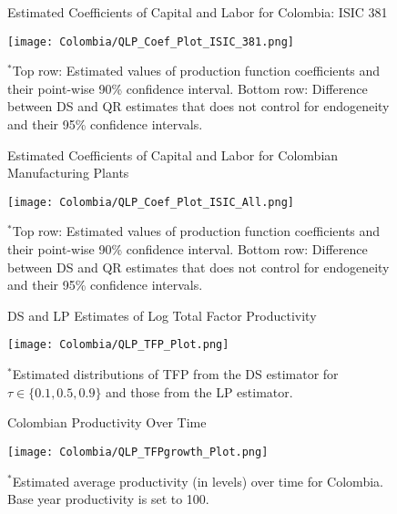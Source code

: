 \documentclass[12pt]{article}
\begin{document}
\begin{appendices}
\begin{figure}[H]
\centering
\caption{Estimated Coefficients of Capital and Labor for Colombia: ISIC 381}
\texttt{[image: Colombia/QLP\_Coef\_Plot\_ISIC\_381.png]}
\caption*{\footnotesize $^{*}$Top row: Estimated values of production function coefficients and their point-wise 90\% confidence interval. Bottom row: Difference between DS and QR estimates that does not control for endogeneity and their 95\% confidence intervals.}
\label{fig:LPCOL381}
\end{figure}

\begin{figure}[H]
\centering
\caption{Estimated Coefficients of Capital and Labor for Colombian Manufacturing Plants}
\texttt{[image: Colombia/QLP\_Coef\_Plot\_ISIC\_All.png]}
\caption*{\footnotesize $^{*}$Top row: Estimated values of production function coefficients and their point-wise 90\% confidence interval. Bottom row: Difference between DS and QR estimates that does not control for endogeneity and their 95\% confidence intervals.}
\label{fig:LPCOLall}
\end{figure}

\begin{figure}[H]
\centering
\caption{DS and LP Estimates of Log Total Factor Productivity}
\texttt{[image: Colombia/QLP\_TFP\_Plot.png]}
\caption*{\footnotesize $^{*}$Estimated distributions of TFP from the DS estimator for $\tau \in \{0.1, 0.5, 0.9\}$ and those from  the LP estimator.}
\label{fig:LPTFPDens}
\end{figure}

\begin{figure}[H]
\centering
\caption{Colombian Productivity Over Time}
\texttt{[image: Colombia/QLP\_TFPgrowth\_Plot.png]}
\caption*{\footnotesize $^{*}$Estimated average productivity (in levels) over time for Colombia. Base year productivity is set to 100.}
\label{fig:LPCOLpgrowth}
\end{figure}


\end{appendices}
\end{document}
